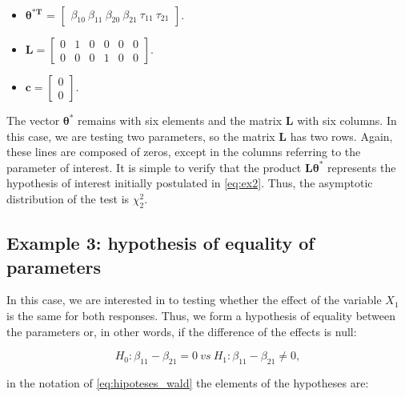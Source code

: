 \documentclass[USenglish]{article}
\theoremstyle{dgthm}
\theoremstyle{dgdef}
\begin{document}
\begin{itemize}
  
  \item $\boldsymbol{\theta^{*T}}$ = $\begin{bmatrix} \beta_{10} \  \beta_{11} \ \beta_{20} \ \beta_{21} \ \tau_{11} \ \tau_{21} \end{bmatrix}$.


\item $\boldsymbol{L} = \begin{bmatrix} 0 & 1 & 0 & 0 & 0 & 0 \\
0 & 0 & 0 & 1 & 0 & 0 \end{bmatrix}.$
 
\item $\boldsymbol{c} = \begin{bmatrix} 0 \\ 0 \end{bmatrix}.$ 

\end{itemize}

The vector $\boldsymbol{\theta^{*}}$ remains with six elements and the matrix $\boldsymbol{L}$ with six columns. In this case, we are testing two parameters, so the matrix $\boldsymbol{L}$ has two rows. Again, these lines are composed of zeros, except in the columns referring to the parameter of interest. It is simple to verify that the product $\boldsymbol{L}\boldsymbol{\theta^{*}}$ represents the hypothesis of interest initially postulated in \autoref{eq:ex2}. Thus, the asymptotic distribution of the test is $\chi^2_2$.

\subsection{Example 3: hypothesis of equality of parameters}

In this case, we are interested in to testing whether the effect of the variable $X_1$ is the same for both responses. Thus, we form a hypothesis of equality between the parameters or, in other words, if the difference of the effects is null:

\begin{equation}
\label{eq:ex3}
H_0: \beta_{11} - \beta_{21} = 0 \ vs \ H_1: \beta_{11} - \beta_{21} \neq 0,
\end{equation}

\noindent in the notation of \autoref{eq:hipoteses_wald} the elements of the hypotheses are:
\end{document}
